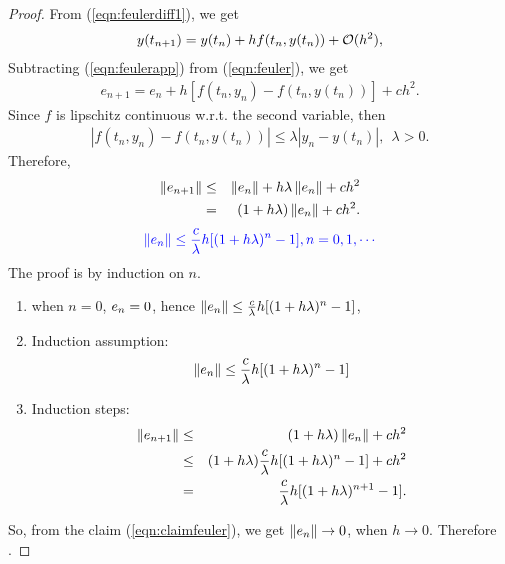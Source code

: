 \documentclass[12pt]  {article}%
\begin{document}
\begin{proof}
From (\ref{eqn:feulerdiff1}), we get
 \begin{eqnarray}\label{eqn:feulerapp}
y(t_{n+1})=y(t_n)+h f(t_n,y(t_{n}))+\mathcal{O}{(h^2)},
\end{eqnarray}
Subtracting (\ref{eqn:feulerapp}) from (\ref{eqn:feuler}), we get
 \begin{eqnarray}\label{eqn:feulerdiff}
 e_{n+1}=e_{n}+h [f(t_n,y_n)-f(t_n,y(t_{n}))]+ch^2.
\end{eqnarray}
Since $f$ is lipschitz continuous w.r.t. the second variable, then
 \begin{eqnarray}
|f(t_n,y_n)-f(t_n,y(t_{n}))| \leq \lambda |y_n-y(t_{n})|,~~\lambda>0.
\end{eqnarray}
Therefore,
 \begin{eqnarray}
 \left\|e_{n+1}\right\|&\leq& \left\|e_n\right\|+h\lambda\left\|e_n\right\|+ch^2\nonumber\\
 &=&(1+h\lambda)\left\|e_n\right\|+ch^2.
\end{eqnarray}
\begin{eqnarray}\label{eqn:claimfeuler}
\textcolor{blue}{\left\|e_n\right\| \leq \frac{c}{\lambda}h[(1+h\lambda)^n-1], n=0,1,\cdots}
\end{eqnarray}
The proof is by induction on $n$.
\begin{enumerate}
\item when $n=0$, $e_n=0$, hence $\left\|e_n\right\| \leq \frac{c}{\lambda}h[(1+h\lambda)^n-1]$,
\item Induction assumption:
\begin{eqnarray*}
\left\|e_n\right\| \leq \frac{c}{\lambda}h[(1+h\lambda)^n-1]
\end{eqnarray*}
\item Induction steps:
\begin{eqnarray}
 \left\|e_{n+1}\right\|&\leq& (1+h\lambda)\left\|e_n\right\|+ch^2 \\
 &\leq& (1+h\lambda) \frac{c}{\lambda}h[(1+h\lambda)^n-1]+ch^2\\
 &=&\frac{c}{\lambda}h[(1+h\lambda)^{n+1}-1].
\end{eqnarray}
\end{enumerate}
So, from the claim (\ref{eqn:claimfeuler}), we get $\left\|e_n\right\|\to 0$, when $h\to 0$. Therefore
.
\end{proof}
\end{document}
